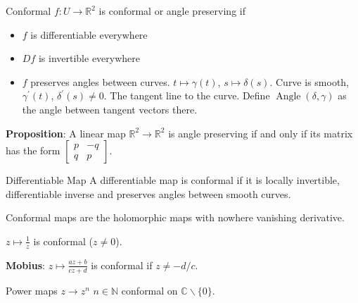\documentclass{report}
\begin{document}
\begin{definition}{Conformal}
    $f : U \rightarrow \mathbb{R}^{2}$ is conformal or angle preserving if 
        \begin{itemize}
            \item $f$ is differentiable everywhere

            \item $Df$ is invertible everywhere

            \item $f$ preserves angles between curves. $t \mapsto \gamma(t)$, $s \mapsto \delta(s)$. Curve is smooth, $\gamma^{\prime}(t)$, $\delta^{\prime}(s) \neq 0$. The tangent line to the curve. Define $\mathop{Angle}(\delta, \gamma)$ as the angle between tangent vectors there.
        \end{itemize}
\end{definition}

\textbf{Proposition}: A linear map $\mathbb{R}^{2} \rightarrow \mathbb{R}^{2}$ is angle preserving if and only if its matrix has the form $\begin{bmatrix}
    p & -q      \\
    q & p
\end{bmatrix}$.

\begin{definition}{Differentiable Map}
    A differentiable map is conformal if it is locally invertible, differentiable inverse and preserves angles between smooth curves.
\end{definition}

\begin{theorem}{}
    Conformal maps are the holomorphic maps with nowhere vanishing derivative.
\end{theorem}

\begin{examples}
    \begin{example}
        $z \mapsto \frac{1}{z}$ is conformal ($z \neq 0$).
    \end{example}
\end{examples}

\textbf{Mobius}: $z \mapsto \frac{az + b}{cz + d}$ is conformal if $z \neq -d/c$.

\begin{examples}
    \begin{example}
        Power maps $z \rightarrow z^{n}$ $n \in \mathbb{N}$ conformal on $\mathbb{C} \backslash \{0\}$.
    \end{example}
\end{examples}
\end{document}
